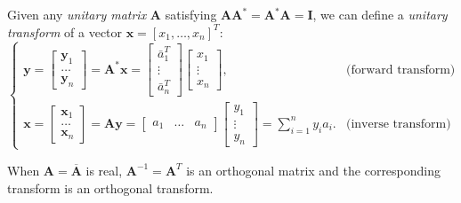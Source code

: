 \documentclass[10pt,b5paper,titlepage]{book}
\begin{document}
Given any \textit{unitary matrix} $\mathbf{A}$ satisfying $\mathbf{A} \mathbf{A}^{*} = \mathbf{A}^{*} \mathbf{A} = \mathbf{I}$, we can define a \textit{unitary transform} of a vector $\mathbf{x} = [x_{1}, \dots, x_{n}]^{T}$:
\begin{equation}
\left\{
    \begin{array}{lr}
        \mathbf{y}
        = \begin{bmatrix}
            \mathbf{y}_{1}\\
            \dots\\
            \mathbf{y}_{n}
        \end{bmatrix}
        = \mathbf{A}^{*} \mathbf{x}
        = \begin{bmatrix}
             \bar{a}_{1}^{T} \\
             \vdots  \\
             \bar{a}_{n}^{T}
        \end{bmatrix}
        \begin{bmatrix}
            x_{1}\\
            \vdots \\
            x_{n}
        \end{bmatrix}, & \text{(forward transform)}\\

        \mathbf{x}
        = \begin{bmatrix}
            \mathbf{x}_{1}\\
            \dots\\
            \mathbf{x}_{n}
        \end{bmatrix}
        = \mathbf{A} \mathbf{y}
        = \begin{bmatrix}
            a_{1} & \dots & a_{n}
        \end{bmatrix}
        \begin{bmatrix}
            y_{1}\\
            \vdots\\
            y_{n}
        \end{bmatrix}
        = \sum_{i=1}^{n} y_{i} a_{i}. & \text{(inverse transform)}
\end{array}
\right.
\end{equation}

When $\mathbf{A} = \overline{\mathbf{A}}$ is real, $\mathbf{A}^{-1} = \mathbf{A}^{T}$ is an orthogonal matrix and the corresponding transform is an orthogonal transform.\\
\end{document}
